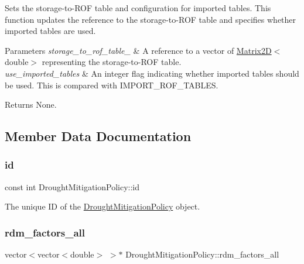 Sets the storage-\/to-\/\+R\+OF table and configuration for imported tables. This function updates the reference to the storage-\/to-\/\+R\+OF table and specifies whether imported tables are used. 


\begin{DoxyParams}{Parameters}
{\em storage\+\_\+to\+\_\+rof\+\_\+table\+\_\+} & A reference to a vector of {\ttfamily \mbox{\hyperlink{classMatrix2D}{Matrix2D}}$<$double$>$} representing the storage-\/to-\/\+R\+OF table. \\
\hline
{\em use\+\_\+imported\+\_\+tables} & An integer flag indicating whether imported tables should be used. This is compared with {\ttfamily I\+M\+P\+O\+R\+T\+\_\+\+R\+O\+F\+\_\+\+T\+A\+B\+L\+ES}.\\
\hline
\end{DoxyParams}
\begin{DoxyReturn}{Returns}
None. 
\end{DoxyReturn}


\subsection{Member Data Documentation}
\mbox{\label{classDroughtMitigationPolicy_abf3ed19ed98e0d74dc9ae24094be640b}} 
\subsubsection{\texorpdfstring{id}{id}}
{\footnotesize\ttfamily const int Drought\+Mitigation\+Policy\+::id}



The unique ID of the \mbox{\hyperlink{classDroughtMitigationPolicy}{Drought\+Mitigation\+Policy}} object. 

\mbox{\label{classDroughtMitigationPolicy_a4c5a2dc2aa3a1c7550cdb17045e1fef3}} 
\subsubsection{\texorpdfstring{rdm\+\_\+factors\+\_\+all}{rdm\_factors\_all}}
{\footnotesize\ttfamily vector$<$vector$<$double$>$ $>$$\ast$ Drought\+Mitigation\+Policy\+::rdm\+\_\+factors\+\_\+all\hspace{0.3cm}{\ttfamily [protected]}}



